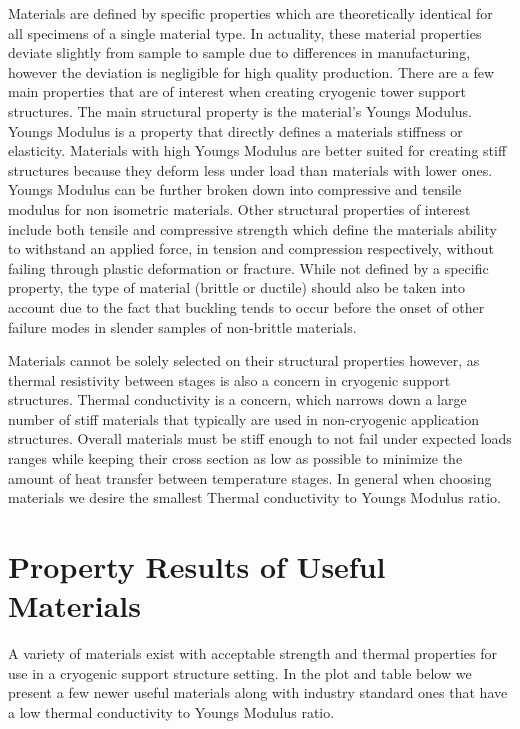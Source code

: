 \documentclass[final]{svjour2}
\begin{document}
Materials are defined by specific properties which are theoretically identical for all specimens of a single material type.  In actuality, these material properties deviate slightly from sample to sample due to differences in manufacturing, however the deviation is negligible for high quality production.  There are a few main properties that are of interest when creating cryogenic tower support structures.  The main structural property is the material's Youngs Modulus.  Youngs Modulus is a property that directly defines a materials stiffness or elasticity.  Materials with high Youngs Modulus are better suited for creating stiff structures because they deform less under load than materials with lower ones.  Youngs Modulus can be further broken down into compressive and tensile modulus for non isometric materials. Other structural properties of interest include both tensile and compressive strength which define the materials ability to withstand an applied force, in tension and compression respectively, without failing through plastic deformation or fracture.  While not defined by a specific property, the type of material (brittle or ductile) should also be taken into account due to the fact that buckling tends to occur before the onset of other failure modes in slender samples of non-brittle materials.  

Materials cannot be solely selected on their structural properties however, as thermal resistivity between stages is also a concern in cryogenic support structures. Thermal conductivity is a concern, which narrows down a large number of stiff materials that typically are used in non-cryogenic application structures.  Overall materials must be stiff enough to not fail under expected loads ranges while keeping their cross section as low as possible to minimize the amount of heat transfer between temperature stages.  In general when choosing materials we desire the smallest Thermal conductivity to Youngs Modulus ratio.\cite{Hastings1993}  

\section{Property Results of Useful Materials}

A variety of materials exist with acceptable strength and thermal properties for use in a cryogenic support structure setting.  In the plot and table below we present a few newer useful materials along with industry standard ones that have a low thermal conductivity to Youngs Modulus ratio.\cite{Doty1981}\cite{Kasen1981}\cite{Runyan2008}\cite{Kellaris2013}\cite{Woodcraft2009}\cite{Woodcraft2009_2}\cite{Ventura2009}
\end{document}
